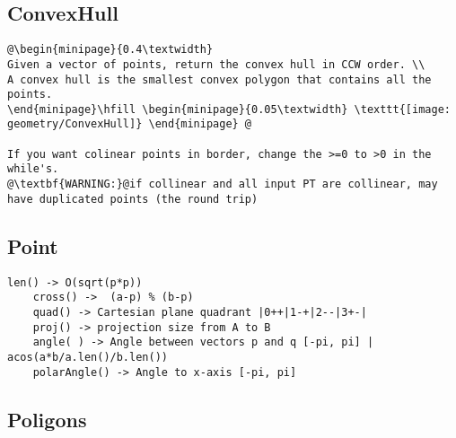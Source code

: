 \vspace{-2pt}
\subsection{ConvexHull}
\vspace{-4pt}
\begin{lstlisting}[style=description]
@\begin{minipage}{0.4\textwidth}
Given a vector of points, return the convex hull in CCW order. \\
A convex hull is the smallest convex polygon that contains all the points.
\end{minipage}\hfill \begin{minipage}{0.05\textwidth} \texttt{[image: geometry/ConvexHull]} \end{minipage} @ 

If you want colinear points in border, change the >=0 to >0 in the while's. 
@\textbf{WARNING:}@if collinear and all input PT are collinear, may have duplicated points (the round trip)

\end{lstlisting}
\vspace{-5pt}
\raggedbottom
\hrulefill

\vspace{-2pt}
\subsection{Point}
\vspace{-4pt}
\begin{lstlisting}[style=description]
	len() -> O(sqrt(p*p))
	cross() ->  (a-p) % (b-p)
	quad() -> Cartesian plane quadrant |0++|1-+|2--|3+-|
	proj() -> projection size from A to B
	angle( ) -> Angle between vectors p and q [-pi, pi] | acos(a*b/a.len()/b.len())
	polarAngle() -> Angle to x-axis [-pi, pi]

\end{lstlisting}
\vspace{-5pt}
\raggedbottom
\hrulefill

\vspace{-2pt}
\subsection{Poligons}
\vspace{-5pt}
\raggedbottom
\hrulefill

